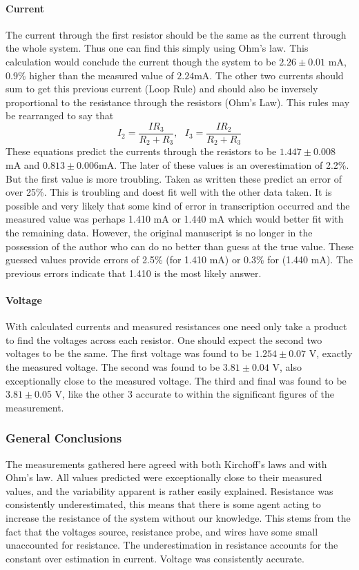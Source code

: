 \documentclass[11pt]{article}
\begin{document}
\paragraph{Current}
The current through the first resistor should be the same as the current through the whole system. Thus one can find this simply using Ohm's law. This calculation would conclude the current though the system to be \(2.26 \pm 0.01 \) mA, 0.9\% higher than the measured value of \(2.24\)mA. The other two currents should sum to get this previous current (Loop Rule) and should also be inversely proportional to the resistance through the resistors (Ohm's Law). This rules may be rearranged to say that 
\begin{equation}
I_2 = \frac{I R_3}{R_2 + R_3}, \text{  } I_3 = \frac{I R_2}{R_2 + R_3}
\end{equation}
These equations predict the currents through the resistors to be \(1.447 \pm 0.008\) mA and \(0.813 \pm 0.006\)mA. The later of these values is an overestimation of 2.2\%. But the first value is more troubling. Taken as written these predict an error of over 25\%. This is troubling and doest fit well with the other data taken. It is possible and very likely that some kind of error in transcription occurred and the measured value was perhaps 1.410 mA or 1.440 mA which would better fit with the remaining data. However, the original manuscript is no longer in the possession of the author who can do no better than guess at the true value. These guessed values provide errors of 2.5\%  (for 1.410 mA) or  0.3\% for (1.440 mA). The previous errors indicate that 1.410 is the most likely answer.
\paragraph{Voltage} With calculated currents and measured resistances one need only take a product to find the voltages across each resistor. One should expect the second two voltages to be the same.
The first voltage was found to be \( 1.254 \pm 0.07 \) V, exactly the measured voltage. The second was found to be \(3.81 \pm 0.04\) V, also exceptionally close to the measured voltage. The third and final was found to be \(3.81 \pm 0.05\) V, like the other 3 accurate to within the significant figures of the measurement.
\subsubsection{General Conclusions}
The measurements gathered here agreed with both Kirchoff's laws and with Ohm's law. All values  predicted were exceptionally close to their measured values, and the variability apparent is rather easily explained. Resistance was consistently underestimated, this means that there is some agent acting to increase the resistance of the system without our knowledge. This stems from the fact that the voltages source, resistance probe, and wires have some small unaccounted for resistance. The underestimation in resistance accounts for the constant over estimation in current. Voltage was consistently accurate.
\end{document}
